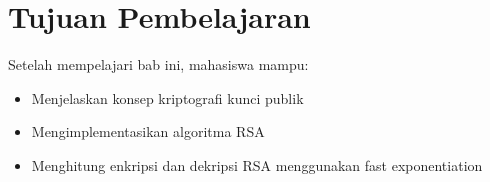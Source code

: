 \section*{Tujuan Pembelajaran}
Setelah mempelajari bab ini, mahasiswa mampu:
\begin{itemize}
\item Menjelaskan konsep kriptografi kunci publik
\item Mengimplementasikan algoritma RSA
\item Menghitung enkripsi dan dekripsi RSA menggunakan fast exponentiation
\end{itemize}
